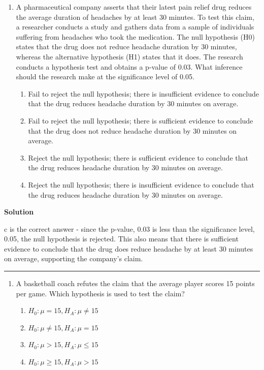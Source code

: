 \documentclass[
  letterpaper,
  DIV=11,
  numbers=noendperiod,
  oneside]{scrreprt}
\providecommand{\tightlist}{%
  \setlength{\itemsep}{0pt}\setlength{\parskip}{0pt}}\usepackage{longtable,booktabs,array}
\begin{document}
\begin{enumerate}
\def\labelenumi{\arabic{enumi}.}
\tightlist
\item
  A pharmaceutical company asserts that their latest pain relief drug
  reduces the average duration of headaches by at least 30 minutes. To
  test this claim, a researcher conducts a study and gathers data from a
  sample of individuals suffering from headaches who took the
  medication. The null hypothesis (H0) states that the drug does not
  reduce headache duration by 30 minutes, whereas the alternative
  hypothesis (H1) states that it does. The research conducts a
  hypothesis test and obtains a p-value of 0.03. What inference should
  the research make at the significance level of 0.05.

  \begin{enumerate}
  \def\labelenumii{\alph{enumii}.}
  \tightlist
  \item
    Fail to reject the null hypothesis; there is insufficient evidence
    to conclude that the drug reduces headache duration by 30 minutes on
    average.
  \item
    Fail to reject the null hypothesis; there is sufficient evidence to
    conclude that the drug does not reduce headache duration by 30
    minutes on average.
  \item
    Reject the null hypothesis; there is sufficient evidence to conclude
    that the drug reduces headache duration by 30 minutes on average.
  \item
    Reject the null hypothesis; there is insufficient evidence to
    conclude that the drug reduces headache duration by 30 minutes on
    average.
  \end{enumerate}
\end{enumerate}

\textbf{Solution}

c is the correct answer - since the p-value, 0.03 is less than the
significance level, 0.05, the null hypothesis is rejected. This also
means that there is sufficient evidence to conclude that the drug does
reduce headache by at least 30 minutes on average, supporting the
company's claim.

\begin{center}\rule{0.5\linewidth}{0.5pt}\end{center}

\begin{enumerate}
\def\labelenumi{\arabic{enumi}.}
\setcounter{enumi}{1}
\tightlist
\item
  A basketball coach refutes the claim that the average player scores 15
  points per game. Which hypothesis is used to test the claim?

  \begin{enumerate}
  \def\labelenumii{\alph{enumii}.}
  \tightlist
  \item
    \(H_0: \mu = 15, H_A: \mu \ne 15\)
  \item
    \(H_0: \mu \ne 15, H_A: \mu = 15\)
  \item
    \(H_0: \mu > 15, H_A: \mu \le 15\)
  \item
    \(H_0: \mu \ge 15, H_A: \mu > 15\)
  \end{enumerate}
\end{enumerate}
\end{document}
